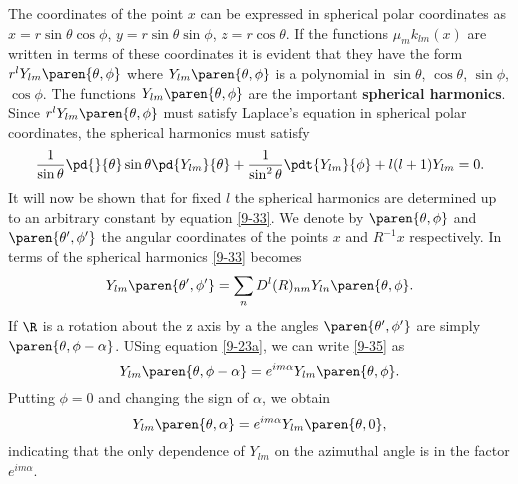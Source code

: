 The coordinates of the point $x$ can be expressed in spherical polar coordinates as $x = r \sin \theta \cos \phi$, $y = r \sin \theta \sin \phi$, $z = r \cos \theta$. If the functions $\mu_{m} k_{lm}(x)$ are written in terms of these coordinates it is evident that they have the form $r^{l} Y_{lm}\paren{\theta,\phi}$ where $Y_{lm}\paren{\theta,\phi}$ is a polynomial in $\sin \theta$, $\cos \theta$, $\sin \phi$, {} $\cos \phi$. The functions $Y_{lm}\paren{\theta,\phi}$ are the important {\bf{spherical harmonics}}. Since $r^{l}Y_{lm}\paren{\theta,\phi}$ must satisfy Laplace's equation in spherical polar coordinates, the spherical harmonics must satisfy
  \begin{equation}
    \frac{1}{\sin \theta} \pd{}{\theta} \sin \theta \pd{Y_{lm}}{\theta} + \frac{1}{\sin^{2} \theta}\pdt{Y_{lm}}{\phi} + l(l+1)Y_{lm} = 0 .
    \label{9-34}
  \end{equation}
It will now be shown that for fixed $l$ the spherical harmonics are
determined up to an arbitrary constant by equation \eqref{9-33}. We denote
by $\paren{\theta, \phi}$ and $\paren{\theta', \phi'}$ the angular coordinates of the points $x$ and $R^{-1}x$ respectively. In terms of the spherical harmonics \eqref{9-33} becomes
  \begin{equation}
    Y_{lm}\paren{\theta', \phi'} = \sum_{n} D^{l}(R)_{nm} Y_{ln} \paren{\theta, \phi}.
    \label{9-35}
  \end{equation}
If $\R$ is a rotation about the z axis by a the angles $\paren{\theta', \phi'}$ are simply $\paren{\theta, \phi-\alpha}$. USing equation \eqref{9-23a}, we can write \eqref{9-35} as
  \begin{equation*}
    Y_{lm}\paren{\theta, \phi-\alpha} = e^{i m \alpha} Y_{lm} \paren{\theta, \phi}.
  \end{equation*}
Putting $\phi = 0$ and changing the sign of $\alpha$, we obtain
  \begin{equation}
    Y_{lm}\paren{\theta, \alpha} = e^{i m \alpha} Y_{lm} \paren{\theta, 0} ,
    \label{9-36}
  \end{equation}
indicating that the only dependence of $Y_{lm}$ on the azimuthal angle is in the factor $e^{i m \alpha}$.


